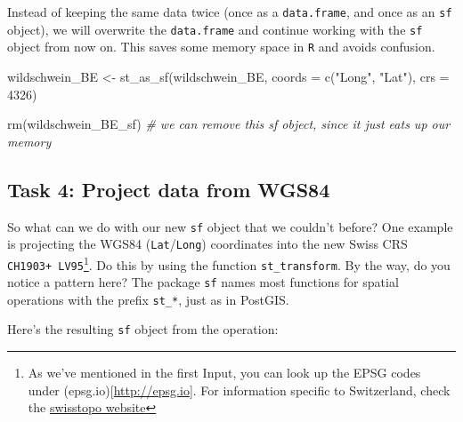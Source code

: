 \documentclass[
]{book}
\newenvironment{Shaded}{\begin{snugshade}}{\end{snugshade}}
\newcommand{\AttributeTok}[1]{\textcolor[rgb]{0.77,0.63,0.00}{#1}}
\newcommand{\CommentTok}[1]{\textcolor[rgb]{0.56,0.35,0.01}{\textit{#1}}}
\newcommand{\DecValTok}[1]{\textcolor[rgb]{0.00,0.00,0.81}{#1}}
\newcommand{\FunctionTok}[1]{\textcolor[rgb]{0.00,0.00,0.00}{#1}}
\newcommand{\NormalTok}[1]{#1}
\newcommand{\OtherTok}[1]{\textcolor[rgb]{0.56,0.35,0.01}{#1}}
\newcommand{\StringTok}[1]{\textcolor[rgb]{0.31,0.60,0.02}{#1}}
\begin{document}
Instead of keeping the same data twice (once as a \texttt{data.frame}, and once as an \texttt{sf} object), we will overwrite the \texttt{data.frame} and continue working with the \texttt{sf} object from now on. This saves some memory space in \texttt{R} and avoids confusion.

\begin{Shaded}
\begin{Highlighting}[]
\NormalTok{wildschwein\_BE }\OtherTok{\textless{}{-}} \FunctionTok{st\_as\_sf}\NormalTok{(wildschwein\_BE, }
                          \AttributeTok{coords =} \FunctionTok{c}\NormalTok{(}\StringTok{"Long"}\NormalTok{, }\StringTok{"Lat"}\NormalTok{), }
                          \AttributeTok{crs =} \DecValTok{4326}\NormalTok{)}

\FunctionTok{rm}\NormalTok{(wildschwein\_BE\_sf) }
\CommentTok{\# we can remove this sf object, since it just eats up our memory}
\end{Highlighting}
\end{Shaded}

\hypertarget{task-4-project-data-from-wgs84}{%
\subsection{Task 4: Project data from WGS84}\label{task-4-project-data-from-wgs84}}

So what can we do with our new \texttt{sf} object that we couldn't before? One example is projecting the WGS84 (\texttt{Lat}/\texttt{Long}) coordinates into the new Swiss CRS \texttt{CH1903+\ LV95}\footnote{As we've mentioned in the first Input, you can look up the EPSG codes under (epsg.io){[}\url{http://epsg.io}{]}. For information specific to Switzerland, check the \href{https://www.swisstopo.admin.ch/en/knowledge-facts/surveying-geodesy/reference-systems.html}{swisstopo website}}. Do this by using the function \texttt{st\_transform}. By the way, do you notice a pattern here? The package \texttt{sf} names most functions for spatial operations with the prefix \texttt{st\_*}, just as in PostGIS.

Here's the resulting \texttt{sf} object from the operation:
\end{document}
